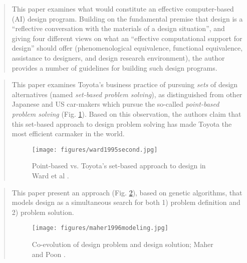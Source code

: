 		\begin{quote}
		\small
		This paper examines what would constitute an effective computer-based (AI) design program.
		Building on the fundamental premise that design is a ``reflective conversation with the materials of 
		a design situation'', and giving four different views on what an 
		``effective computational support for design''
		should offer (phenomenological equivalence, functional equivalence, assistance to 
		designers, and design research environment), the author provides a number of guidelines
		for building such design programs.
		\end{quote}
		
		\begin{quote}
		\small
		This paper examines Toyota's business practice of pursuing {\em sets} of design alternatives
		(named {\em set-based problem solving}), as distinguished from other Japanese and US car-makers
		which pursue the so-called {\em point-based problem solving} (Fig. \ref{fig:ward1995second}). 
		Based on this observation, 
		the authors claim that this set-based approach to design problem solving has made Toyota
		the most efficient carmaker in the world.
		\begin{figure}[htb]
		\begin{center}
		\texttt{[image: figures/ward1995second.jpg]}
		\caption{Point-based vs. Toyota's set-based approach to design in Ward et al \cite{ward1995second}.}
		\label{fig:ward1995second}
		\end{center}
		\end{figure}		
		\end{quote}

		
		\begin{quote}
		\small
		This paper present an approach (Fig. \ref{fig:maher1996modeling}), 
		based on genetic algorithms, that models 
		design as a simultaneous search for both 1) problem definition and 2) problem solution.
		\begin{figure}[htb]
		\begin{center}
		\texttt{[image: figures/maher1996modeling.jpg]}%
		\caption{Co-evolution of design problem and design solution; Maher and Poon \cite{maher1996modeling}.}
		\label{fig:maher1996modeling}
		\end{center}
		\end{figure}		
		\end{quote}
		
